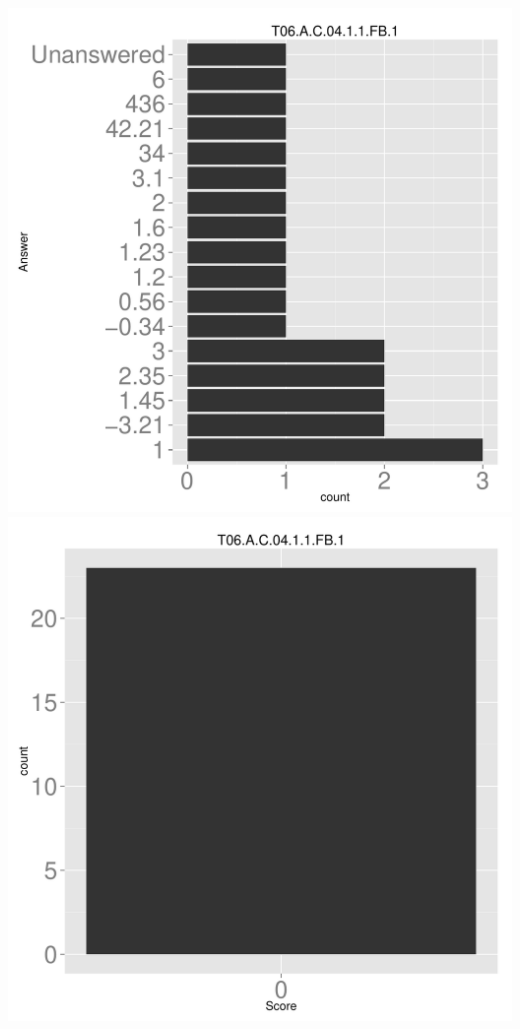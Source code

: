 \documentclass[12pt,nohyper]{tufte-handout}\usepackage[]{graphicx}\usepackage[]{color}
\begin{document}
\begin{center} \includegraphics[width=.45\linewidth]{Topic06_9_answer} \includegraphics[width=.45\linewidth]{Topic06_9_score} \end{center} 
\end{document}
